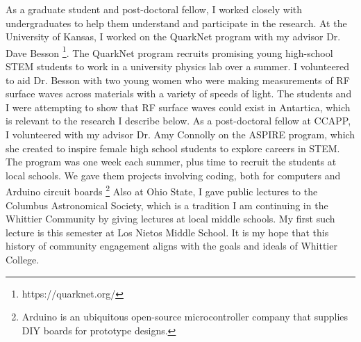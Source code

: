 \documentclass[../../main.tex]{subfiles}
\begin{document}
As a graduate student and post-doctoral fellow, I worked closely with undergraduates to help them understand and participate in the research.  At the University of Kansas, I worked on the QuarkNet program with my advisor Dr. Dave Besson \footnote{https://quarknet.org/}.  The QuarkNet program recruits promising young high-school STEM students to work in a university physics lab over a summer.  I volunteered to aid Dr. Besson with two young women who were making measurements of RF surface waves across materials with a variety of speeds of light.  The students and I were attempting to show that RF surface waves could exist in Antartica, which is relevant to the research I describe below.  As a post-doctoral fellow at CCAPP, I volunteered with my advisor Dr. Amy Connolly on the ASPIRE program, which she created to inspire female high school students to explore careers in STEM.  The program was one week each summer, plus time to recruit the students at local schools.  We gave them projects involving coding, both for computers and Arduino circuit boards \footnote{Arduino is an ubiquitous open-source microcontroller company that supplies DIY boards for prototype designs.}  Also at Ohio State, I gave public lectures to the Columbus Astronomical Society, which is a tradition I am continuing in the Whittier Community by giving lectures at local middle schools.  My first such lecture is this semester at Los Nietos Middle School.  It is my  hope that this history of community engagement aligns with the goals and ideals of Whittier College.
\end{document}
